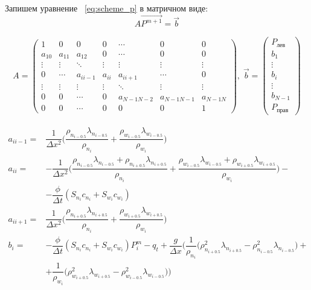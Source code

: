 Запишем уравнение ~\ref{eq:scheme_p} в матричном виде:
\begin{equation} \label{eq:scheme_p_matrix}
A\overrightarrow{P^{m+1}} = \vec{b}
\end{equation}

\begin{equation} \label{eq:p_matrix}
\begin{aligned}
A = \begin{pmatrix}
1 & 0 & 0 & 0 & \cdots & 0 & 0 \\
a_{10} & a_{11} & a_{12} & 0 & \cdots & 0 & 0 \\
\vdots & \vdots & \ddots & \vdots & \vdots & \vdots & \vdots \\
0 & \cdots & a_{ii-1} & a_{ii} & a_{ii+1} & \cdots & 0 \\
\vdots & \vdots & \vdots & \vdots & \ddots & \vdots & \vdots\\
0 & 0 & \cdots & 0 & a_{N-1 N-2} & a_{N-1 N-1} & a_{N-1 N} \\
0 & 0 & \cdots & 0 & 0 & 0 & 1
\end{pmatrix}, \;
\vec{b} = \begin{pmatrix}
P_{\text{лев}} \\
b_1 \\
\vdots \\
b_i \\
\vdots \\
b_{N-1} \\
P_{\text{прав}}
\end{pmatrix}
\end{aligned}
\end{equation}

\begin{equation} \label{eq:p_matrix_i}
\begin{aligned}
a_{ii-1} = & \dfrac{1}{\Delta x^2} \big(\dfrac{\rho_{n_{i-0.5}} \lambda_{n_{i-0.5}}}{\rho_{n_i}} + \dfrac{\rho_{w_{i-0.5}} \lambda_{w_{i-0.5}}}{\rho_{w_i}} \big) \\
a_{ii} = & -\dfrac{1}{\Delta x^2} \big(\dfrac{\rho_{n_{i-0.5}} \lambda_{n_{i-0.5}} + \rho_{n_{i+0.5}} \lambda_{n_{i+0.5}}}{\rho_{n_i}} 
+ \dfrac{\rho_{w_{i-0.5}} \lambda_{w_{i-0.5}} + \rho_{w_{i+0.5}} \lambda_{w_{i+0.5}}}{\rho_{w_i}} \big) - \\
& - \dfrac{\phi}{\Delta t} (S_{n_i}c_{n_i}+S_{w_i}c_{w_i}) \\
a_{ii+1} = & \dfrac{1}{\Delta x^2} \big(\dfrac{\rho_{n_{i+0.5}} \lambda_{n_{i+0.5}}}{\rho_{n_i}} + \dfrac{\rho_{w_{i+0.5}} \lambda_{w_{i+0.5}}}{\rho_{w_i}} \big) \\
b_i = & - \dfrac{\phi}{\Delta t} (S_{n_i}c_{n_i}+S_{w_i}c_{w_i})P_i^m - q_t + \dfrac{g}{\Delta x} \bigg(\dfrac{1}{\rho_{n_i}} \big( \rho_{n_{i+0.5}}^2 \lambda_{n_{i+0.5}} 
  - \rho_{n_{i-0.5}}^2 \lambda_{n_{i-0.5}} \big) + \\
  &+ \dfrac{1}{\rho_{w_i}} \big( \rho_{w_{i+0.5}}^2 \lambda_{w_{i+0.5}} 
  - \rho_{w_{i-0.5}}^2 \lambda_{w_{i-0.5}} \big)\bigg)
\end{aligned}
\end{equation}


